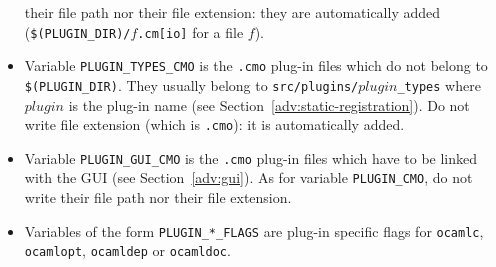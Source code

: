 \begin{itemize}
  their file path nor their file extension: they are automatically added
  (\texttt{\$(PLUGIN\_DIR)/$f$.cm[io]} for a file $f$).
\item Variable
  \texttt{PLUGIN\_TYPES\_CMO}
  is the \texttt{.cmo} plug-in files which do not belong to
  \texttt{\$(PLUGIN\_DIR)}. They usually belong to
  \texttt{src/plugins/$plugin$\_types} where $plugin$ is the plug-in name (see
  Section~\ref{adv:static-registration}). Do not 
  write file extension (which is \texttt{.cmo}): it is automatically
  added.
\item Variable
  \texttt{PLUGIN\_GUI\_CMO} is
  the \texttt{.cmo} plug-in files which have to be linked with the GUI (see
  Section~\ref{adv:gui}). As for variable \texttt{PLUGIN\_CMO}, do not write
  their file path nor their file extension.
%
\item Variables of the form \texttt{PLUGIN\_*\_FLAGS} are
  plug-in specific flags for \texttt{ocamlc}, \texttt{ocamlopt},
  \texttt{ocamldep} or \texttt{ocamldoc}.
\end{itemize}
